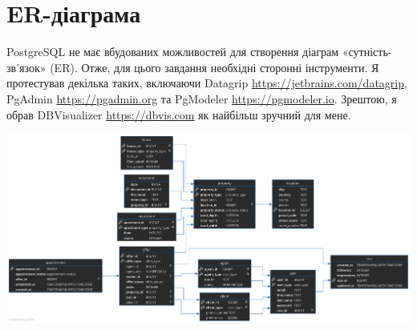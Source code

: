 \section{ER-діаграма}

PostgreSQL не має вбудованих можливостей для створення діаграм «сутність-зв'язок» (ER).
Отже, для цього завдання необхідні сторонні інструменти.
Я протестував декілька таких, включаючи Datagrip \url{https://jetbrains.com/datagrip},
PgAdmin \url{https://pgadmin.org} та PgModeler \url{https://pgmodeler.io}.
Зрештою, я обрав DBVisualizer \url{https://dbvis.com} як найбільш зручний для мене.

\includegraphics[width=1\linewidth]{../assets/dbvis.pdf}
